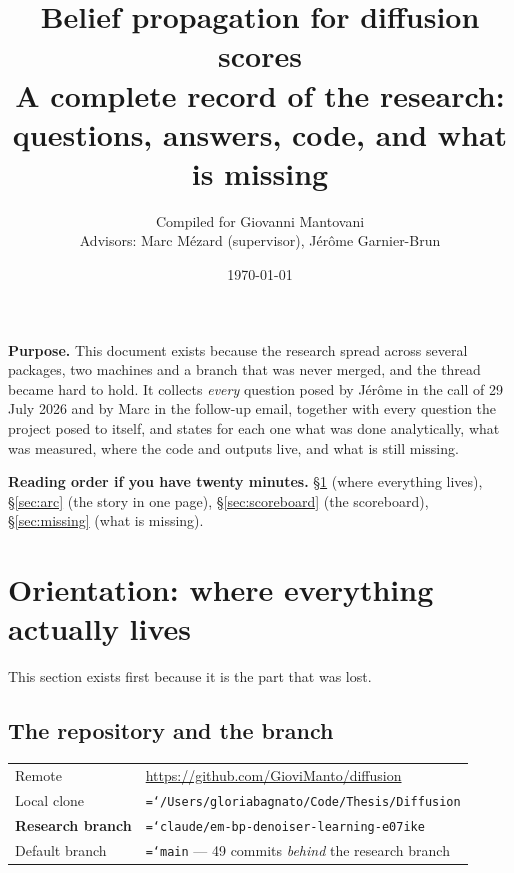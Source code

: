 \documentclass[11pt,a4paper]{article}
\title{\vspace{-1.5cm}\textbf{Belief propagation for diffusion scores}\\[0.3em]
\large A complete record of the research: questions, answers, code, and what is missing}
\author{Compiled for Giovanni Mantovani\\[0.2em]
\small Advisors: Marc M\'ezard (supervisor), J\'er\^ome Garnier-Brun}
\date{\today}
\newcommand{\code}[1]{\texttt{\small\hyphenchar\font=`\-\relax #1}}
\begin{document}
\maketitle
\thispagestyle{fancy}

\begin{keybox}
\textbf{Purpose.} This document exists because the research spread across several
packages, two machines and a branch that was never merged, and the thread became hard to
hold. It collects \emph{every} question posed by J\'er\^ome in the call of 29 July 2026 and
by Marc in the follow-up email, together with every question the project posed to itself,
and states for each one what was done analytically, what was measured, where the code and
outputs live, and what is still missing.

\medskip
\textbf{Reading order if you have twenty minutes.} \S\ref{sec:orient} (where everything
lives), \S\ref{sec:arc} (the story in one page), \S\ref{sec:scoreboard} (the scoreboard),
\S\ref{sec:missing} (what is missing).
\end{keybox}

\tableofcontents
\newpage

\section{Orientation: where everything actually lives}
\label{sec:orient}

This section exists first because it is the part that was lost.

\subsection{The repository and the branch}

\begin{center}
\begin{tabular}{@{}ll@{}}
\toprule
Remote & \url{https://github.com/GioviManto/diffusion} \\
Local clone & \code{/Users/gloriabagnato/Code/Thesis/Diffusion} \\
\textbf{Research branch} & \code{claude/em-bp-denoiser-learning-e07ike} \\
Default branch & \code{main} --- 49 commits \emph{behind} the research branch \\
\bottomrule
\end{tabular}
\end{center}
\end{document}
